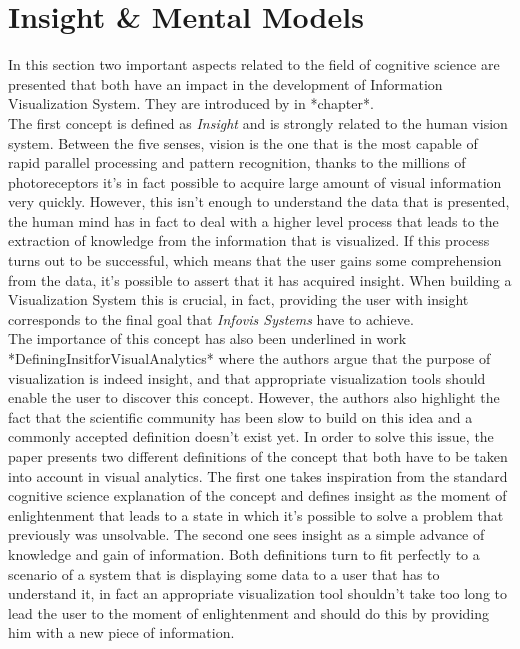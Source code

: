 \documentclass[10p,letterpaper]{article}
\begin{document}
\section{Insight \& Mental Models}

In this section two important aspects related to the field of cognitive science are presented that both have an impact in the development of Information Visualization System. They are introduced by in *chapter*.\\  
The first concept is defined as \textit{Insight} and is strongly related to the human vision system. Between the five senses, vision is the one that is the most capable of rapid parallel processing and pattern recognition, thanks to the millions of photoreceptors it's in fact possible to acquire large amount of visual information very quickly. However, this isn't enough to understand the data that is presented, the human mind has in fact to deal with a higher level process that leads to the extraction of knowledge from the information that is visualized. If this process turns out to be successful, which means that the user gains some comprehension from the data, it's possible to assert that it has acquired insight. When building a Visualization System this is crucial, in fact, providing the user with insight corresponds to the final goal that \textit{Infovis Systems} have to achieve.\\
The importance of this concept has also been underlined in work *DefiningInsitforVisualAnalytics* where the authors argue that the purpose of visualization is indeed insight, and that appropriate visualization tools should enable the user to discover this concept. However, the authors also highlight the fact that the scientific community has been slow to build on this idea and a commonly accepted definition doesn't exist yet. In order to solve this issue, the paper presents two different definitions of the concept that both have to be taken into account in visual analytics. The first one takes inspiration from the standard cognitive science explanation of the concept and defines insight as the moment of enlightenment that leads to a state in which it's possible to solve a problem that previously was unsolvable. The second one sees insight as a simple advance of knowledge and gain of information. Both definitions turn to fit perfectly to a scenario of a system that is displaying some data to a user that has to understand it, in fact an appropriate visualization tool shouldn't take too long to lead the user to the moment of enlightenment and should do this by providing him with a new piece of information.\\
\end{document}

